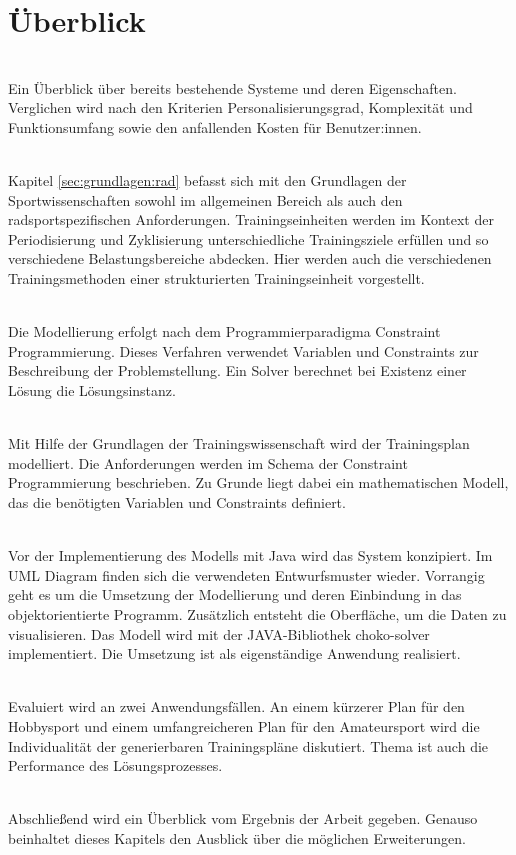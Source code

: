 \section{Überblick}
\label{sec:intro:ueberblick}
\textbf{} \\[0.2em]
Ein Überblick über bereits bestehende Systeme und deren Eigenschaften. Verglichen wird nach den Kriterien Personalisierungsgrad, Komplexität und Funktionsumfang sowie den anfallenden Kosten für Benutzer:innen.

\textbf{} \\[0.2em]
Kapitel \ref{sec:grundlagen:rad} befasst sich mit den Grundlagen der Sportwissenschaften sowohl im allgemeinen Bereich als auch den radsportspezifischen Anforderungen. Trainingseinheiten werden im Kontext der Periodisierung und Zyklisierung unterschiedliche Trainingsziele erfüllen und so verschiedene Belastungsbereiche abdecken. Hier werden auch die verschiedenen Trainingsmethoden einer strukturierten Trainingseinheit vorgestellt.

\textbf{} \\[0.2em]
Die Modellierung erfolgt nach dem Programmierparadigma Constraint Programmierung. Dieses Verfahren verwendet Variablen und Constraints zur Beschreibung der Problemstellung. Ein Solver berechnet bei Existenz einer Lösung die Lösungsinstanz. 

\textbf{} \\[0.2em]
Mit Hilfe der Grundlagen der Trainingswissenschaft wird der Trainingsplan modelliert. Die Anforderungen werden im Schema der Constraint Programmierung beschrieben. Zu Grunde liegt dabei ein mathematischen Modell, das die benötigten Variablen und Constraints definiert.

\textbf{} \\[0.2em]
Vor der Implementierung des Modells mit Java wird das System konzipiert. Im UML Diagram finden sich die verwendeten Entwurfsmuster wieder. Vorrangig geht es um die Umsetzung der Modellierung und deren Einbindung in das objektorientierte Programm. Zusätzlich entsteht die Oberfläche, um die Daten zu visualisieren. Das Modell wird mit der JAVA-Bibliothek choko-solver implementiert. Die Umsetzung ist als eigenständige Anwendung realisiert. 

\textbf{} \\[0.2em]
Evaluiert wird an zwei Anwendungsfällen. An einem kürzerer Plan für den Hobbysport und einem umfangreicheren Plan für den Amateursport wird die Individualität der generierbaren Trainingspläne diskutiert. Thema ist auch die Performance des Lösungsprozesses.

\textbf{} \\[0.2em]
Abschließend wird ein Überblick vom Ergebnis der Arbeit gegeben. Genauso beinhaltet dieses Kapitels den Ausblick über die möglichen Erweiterungen.